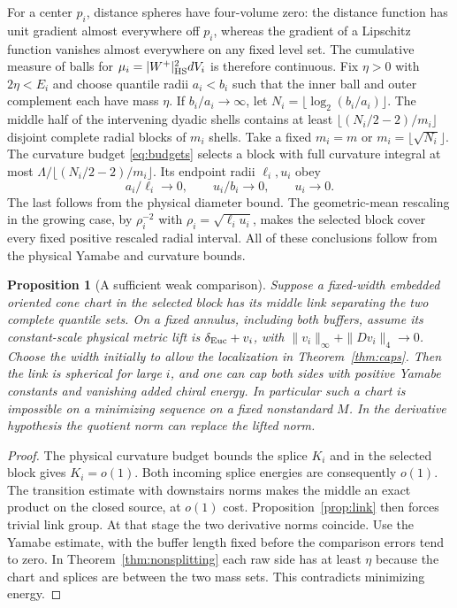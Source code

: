 \documentclass[11pt]{article}
\numberwithin{equation}{section}
\newtheorem{proposition}[theorem]{Proposition}
\theoremstyle{definition}
\theoremstyle{remark}
\begin{document}
For a center \(p_i\), distance spheres have four-volume
zero: the distance function has unit gradient almost
everywhere off \(p_i\), whereas the gradient of a Lipschitz
function vanishes almost everywhere on any fixed level set.
The cumulative measure of balls for
\(\mu_i=|W^+|_{\rm HS}^2dV_i\) is therefore continuous.
Fix \(\eta>0\) with \(2\eta<E_i\) and choose quantile radii
\(a_i<b_i\) such that the inner ball and outer complement
each have mass \(\eta\). If \(b_i/a_i\to\infty\), let
\(N_i=\lfloor\log_2(b_i/a_i)\rfloor\). The middle half of
the intervening dyadic shells contains at least
\(\lfloor (N_i/2-2)/m_i\rfloor\) disjoint complete radial
blocks of \(m_i\) shells. Take a fixed \(m_i=m\) or
\(m_i=\lfloor\sqrt{N_i}\rfloor\). The curvature budget
\eqref{eq:budgets} selects a block with full curvature
integral at most \(\Lambda/\lfloor(N_i/2-2)/m_i\rfloor\).
Its endpoint radii \(\ell_i,u_i\) obey
\[
 a_i/\ell_i\to0,\qquad u_i/b_i\to0,\qquad u_i\to0 .
\]
The last follows from the physical diameter bound.
The geometric-mean rescaling in the growing case, by
\(\rho_i^{-2}\) with \(\rho_i=\sqrt{\ell_i u_i}\), makes
the selected block cover every fixed positive rescaled radial
interval. All of these conclusions follow from the physical
Yamabe and curvature bounds.

\begin{proposition}[A sufficient weak comparison]\label{prop:weakquantiles}
Suppose a fixed-width embedded oriented cone chart in the
selected block has its middle link separating the two
complete quantile sets. On a fixed annulus, including
both buffers, assume its constant-scale physical metric
lift is \(\delta_{\rm Euc}+v_i\), with
\(\|v_i\|_\infty+\|Dv_i\|_4\to0\).
Choose the width initially to allow the localization in
Theorem~\ref{thm:caps}. Then the link is spherical for large
\(i\), and one can cap both sides with positive Yamabe
constants and vanishing added chiral energy. In particular
such a chart is impossible on a minimizing sequence on a
fixed nonstandard \(M\). In the derivative hypothesis the
quotient norm can replace the lifted norm.
\end{proposition}
\begin{proof}
The physical curvature budget bounds the splice \(K_i\)
and in the selected block gives \(K_i=o(1)\). Both
incoming splice energies are consequently \(o(1)\).
The transition estimate with downstairs norms makes the
middle an exact product on the closed source, at \(o(1)\)
cost. Proposition~\ref{prop:link} then forces trivial link
group. At that stage the two derivative norms coincide.
Use the Yamabe estimate, with the buffer length fixed
before the comparison errors tend to zero. In
Theorem~\ref{thm:nonsplitting} each raw side has at least
\(\eta\) because the chart and splices are between the
two mass sets. This contradicts minimizing energy.
\end{proof}
\end{document}
